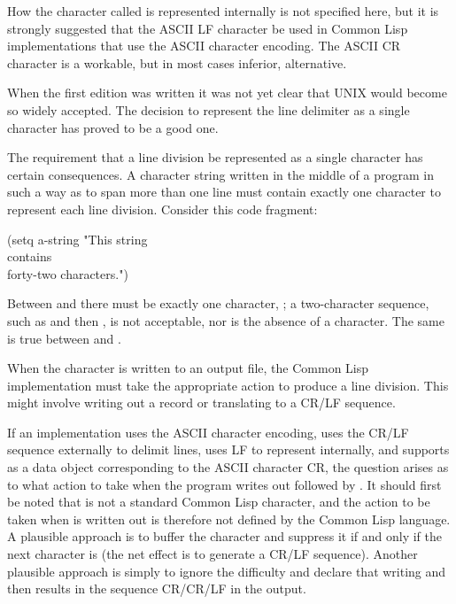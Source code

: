 \beforenoterule
\begin{implementation}
How the character called  is represented
internally is not specified here, but it is strongly suggested that
the ASCII LF character be used in Common Lisp implementations that use the
ASCII character encoding.  The ASCII CR character is a workable,
but in most cases inferior, alternative.
\end{implementation}
\afternoterule

\begin{newer}
When the first edition was written it was not yet clear that UNIX would
become so widely accepted.  The decision to represent
the line delimiter as a single character has proved to be a good one.
\end{newer}

The requirement that a line division be represented as a single character
has certain consequences.  A character string
written in the middle of a program in such a way as to span more than
one line must contain exactly one character to represent each line division.
Consider this code fragment:
\begin{lisp}
(setq a-string "This string \\
contains \\
forty-two characters.")
\end{lisp}
Between  and  there must be exactly one character,
; a two-character sequence, such as  and then
, is not acceptable, nor is the absence of a character.
The same is true between  and .

When the character  is written to an output file,
the Common Lisp implementation must take the appropriate action
to produce a line division.  This might involve writing out a
record or translating  to a CR/LF sequence.

\beforenoterule
\begin{implementation}
If an implementation uses the ASCII character encoding,
uses the CR/LF sequence externally to delimit lines,
uses LF to represent  internally, and supports 
as a data object corresponding to the ASCII character CR, the
question arises as to what action to take when the program
writes out  followed by .
It should first be noted that  is not a standard Common Lisp
character, and the action to be taken when  is written out
is therefore not defined by the Common Lisp language.  A plausible approach
is to buffer the  character and suppress it if and only if the
next character is  (the net effect is to generate a CR/LF
sequence).
Another plausible
approach is simply to ignore
the difficulty and declare that writing  and then
 results in the sequence CR/CR/LF in the output.
\end{implementation}
\afternoterule

